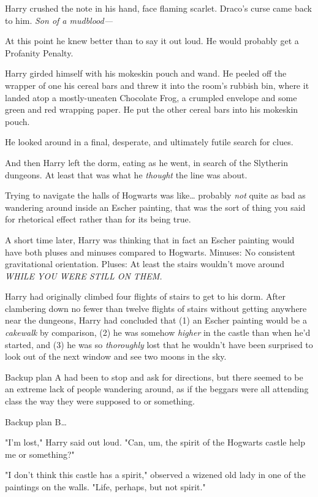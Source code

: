 Harry crushed the note in his hand, face flaming scarlet. Draco's curse came 
back to him. \emph{Son of a mudblood---}

At this point he knew better than to say it out loud. He would probably get a 
Profanity Penalty.

Harry girded himself with his mokeskin pouch and wand. He peeled off the 
wrapper of one his cereal bars and threw it into the room's rubbish bin, where 
it landed atop a mostly-uneaten Chocolate Frog, a crumpled envelope and some 
green and red wrapping paper. He put the other cereal bars into his mokeskin 
pouch.

He looked around in a final, desperate, and ultimately futile search for clues.

And then Harry left the dorm, eating as he went, in search of the Slytherin 
dungeons. At least that was what he \emph{thought} the line was about.

Trying to navigate the halls of Hogwarts was like{\ldots} probably \emph{not} 
quite as bad as wandering around inside an Escher painting, that was the sort 
of thing you said for rhetorical effect rather than for its being true.

A short time later, Harry was thinking that in fact an Escher painting would 
have both pluses and minuses compared to Hogwarts. Minuses: No consistent 
gravitational orientation. Pluses: At least the stairs wouldn't move 
around \emph{WHILE YOU WERE STILL ON THEM.}

Harry had originally climbed four flights of stairs to get to his dorm. After 
clambering down no fewer than twelve flights of stairs without getting anywhere 
near the dungeons, Harry had concluded that (1) an Escher painting would be a 
\emph{cakewalk} by comparison, (2) he was somehow \emph{higher} in the castle 
than when he'd started, and (3) he was so \emph{thoroughly} lost that he 
wouldn't have been surprised to look out of the next window and see two moons 
in the sky.

Backup plan A had been to stop and ask for directions, but there seemed to be 
an extreme lack of people wandering around, as if the beggars were all 
attending class the way they were supposed to or something.

Backup plan B{\ldots}

"I'm lost," Harry said out loud. "Can, um, the spirit of the Hogwarts castle 
help me or something?"

"I don't think this castle has a spirit," observed a wizened old lady in one of 
the paintings on the walls. "Life, perhaps, but not spirit."

